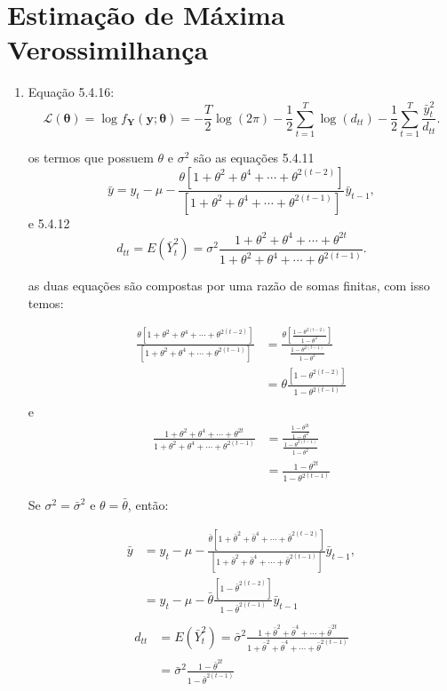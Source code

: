 \chapter{Estimação de Máxima Verossimilhança}


\begin{enumerate}
	\item[\fbox{5.1}]
	
	
	Equação 5.4.16: $$\mathscr{L}(\boldsymbol{\theta})=\log f_{\mathbf{Y}}(\mathbf{y};\boldsymbol{\theta})=-\frac{T}{2}\log (2\pi)-\frac{1}{2}\sum \limits_{t=1}^T\log (d_{tt})-\frac{1}{2}\sum \limits _{t=1}^T\frac{\bar{y}_t^2}{d_{tt}}.$$
	
	os termos que possuem $\theta$ e $\sigma^2$ são as equações 5.4.11
	$$\bar{y}=y_t-\mu-\frac{\theta[1+\theta^2+\theta^4+\cdots+\theta^{2(t-2)}]}{[1+\theta^2+\theta^4+\cdots+\theta^{2(t-1)}]}\bar{y}_{t-1},$$
	e 5.4.12
	$$d_{tt}=E(\bar{Y}_t^2)=\sigma^2\frac{1+\theta^2+\theta^4+\cdots+\theta^{2t}}{1+\theta^2+\theta^4+\cdots+\theta^{2(t-1)}}.$$
	
	as duas equações são compostas por uma razão de somas finitas, com isso temos:
	
	\begin{align*}
		\frac{\theta[1+\theta^2+\theta^4+\cdots+\theta^{2(t-2)}]}{[1+\theta^2+\theta^4+\cdots+\theta^{2(t-1)}]}&=\frac{\theta[\frac{1-\theta^{2(t-2)}}{1-\theta^2}]}{\frac{1-\theta^{2(t-1)}}{1-\theta^2}}\\
		&=\theta\frac{[1-\theta^{2(t-2)}]}{1-\theta^{2(t-1)}}\\
	\end{align*}
	e
	\begin{align*}
		\frac{1+\theta^2+\theta^4+\cdots+\theta^{2t}}{1+\theta^2+\theta^4+\cdots+\theta^{2(t-1)}}&=\frac{\frac{1-\theta^{2t}}{1-\theta^2}}{\frac{1-\theta^{2(t-1)}}{1-\theta^2}}\\
		&=\frac{1-\theta^{2t}}{1-\theta^{2(t-1)}}
	\end{align*}
	
	Se $\sigma^2=\bar{\sigma}^2$ e $\theta=\bar{\theta}$, então:
	
	
	\begin{align*}
	\bar{y}&=y_t-\mu-\frac{\bar{\theta}[1+\bar{\theta}^2+\bar{\theta}^4+\cdots+\bar{\theta}^{2(t-2)}]}{[1+\bar{\theta}^2+\bar{\theta}^4+\cdots+\bar{\theta}^{2(t-1)}]}\bar{y}_{t-1},\\
	&=y_t-\mu-\bar{\theta}\frac{[1-\bar{\theta}^{2(t-2)}]}{1-\bar{\theta}^{2(t-1)}}\bar{y}_{t-1}\\
	\end{align*}
	\begin{align*}
	d_{tt}&=E(\bar{Y}_t^2)=\bar{\sigma}^2\frac{1+\bar{\theta}^2+\bar{\theta}^4+\cdots+\bar{\theta}^{2t}}{1+\bar{\theta}^2+\bar{\theta}^4+\cdots+\bar{\theta}^{2(t-1)}}\\
	&=\bar{\sigma}^2\frac{1-\bar{\theta}^{2t}}{1-\bar{\theta}^{2(t-1)}}
	\end{align*}
	

\end{enumerate}
